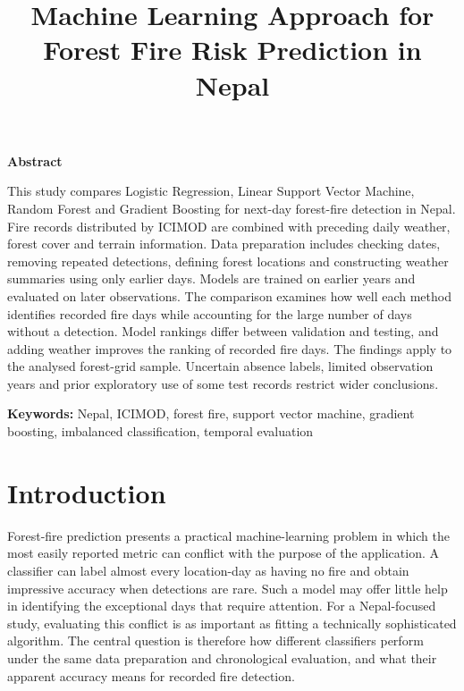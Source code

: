 \documentclass[conference,a4paper]{IEEEtran}
\title{Machine Learning Approach for Forest Fire Risk Prediction in Nepal}
\author{\IEEEauthorblockN{Krijal Shrestha}\IEEEauthorblockA{Coventry ID: 11495103\\STW7072CEM Machine Learning\\Softwarica College of IT and E-commerce, Coventry University}}
\renewenvironment{abstract}{\par\noindent\textbf{Abstract}\par\smallskip\normalfont\normalsize\RaggedRight}{\par\medskip}
\renewenvironment{IEEEkeywords}{\par\noindent\textbf{Keywords: }\normalfont\normalsize\RaggedRight}{\par\medskip}
\begin{document}
\makeatletter
\renewcommand{\@maketitle}{%
\newpage\null\vskip 1em%
{\raggedright\LARGE\bfseries\@title\par}%
\vskip 1em%
{\raggedright\normalsize Krijal Shrestha\\
Coventry ID: 11495103\\
STW7072CEM Machine Learning\\
Softwarica College of IT and E-commerce, Coventry University\par}%
\vskip 1.5em}
\makeatother
\maketitle
\RaggedRight
\begin{abstract}
This study compares Logistic Regression, Linear Support Vector Machine, Random Forest and Gradient Boosting for next-day forest-fire detection in Nepal. Fire records distributed by ICIMOD are combined with preceding daily weather, forest cover and terrain information. Data preparation includes checking dates, removing repeated detections, defining forest locations and constructing weather summaries using only earlier days. Models are trained on earlier years and evaluated on later observations. The comparison examines how well each method identifies recorded fire days while accounting for the large number of days without a detection. Model rankings differ between validation and testing, and adding weather improves the ranking of recorded fire days. The findings apply to the analysed forest-grid sample. Uncertain absence labels, limited observation years and prior exploratory use of some test records restrict wider conclusions.
\end{abstract}
\begin{IEEEkeywords}
Nepal, ICIMOD, forest fire, support vector machine, gradient boosting, imbalanced classification, temporal evaluation
\end{IEEEkeywords}

\section{Introduction}
Forest-fire prediction presents a practical machine-learning problem in which the most easily reported metric can conflict with the purpose of the application. A classifier can label almost every location-day as having no fire and obtain impressive accuracy when detections are rare. Such a model may offer little help in identifying the exceptional days that require attention. For a Nepal-focused study, evaluating this conflict is as important as fitting a technically sophisticated algorithm. The central question is therefore how different classifiers perform under the same data preparation and chronological evaluation, and what their apparent accuracy means for recorded fire detection.
\end{document}
